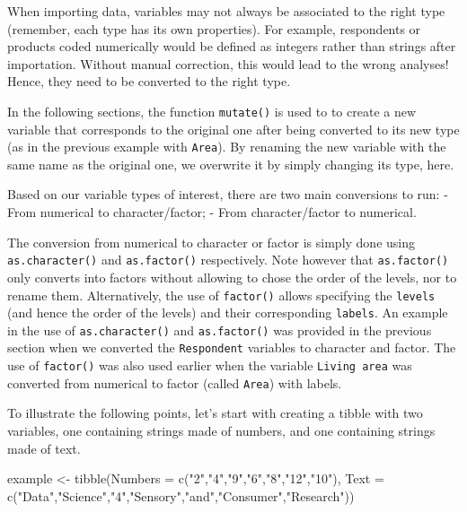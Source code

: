\documentclass[
]{book}
\newenvironment{Shaded}{\begin{snugshade}}{\end{snugshade}}
\newcommand{\AttributeTok}[1]{\textcolor[rgb]{0.77,0.63,0.00}{#1}}
\newcommand{\FunctionTok}[1]{\textcolor[rgb]{0.00,0.00,0.00}{#1}}
\newcommand{\NormalTok}[1]{#1}
\newcommand{\OtherTok}[1]{\textcolor[rgb]{0.56,0.35,0.01}{#1}}
\newcommand{\StringTok}[1]{\textcolor[rgb]{0.31,0.60,0.02}{#1}}
\begin{document}
When importing data, variables may not always be associated to the right type (remember, each type has its own properties). For example, respondents or products coded numerically would be defined as integers rather than strings after importation. Without manual correction, this would lead to the wrong analyses! Hence, they need to be converted to the right type.

In the following sections, the function \texttt{mutate()} is used to to create a new variable that corresponds to the original one after being converted to its new type (as in the previous example with \texttt{Area}). By renaming the new variable with the same name as the original one, we overwrite it by simply changing its type, here.

Based on our variable types of interest, there are two main conversions to run:
- From numerical to character/factor;
- From character/factor to numerical.

The conversion from numerical to character or factor is simply done using \texttt{as.character()} and \texttt{as.factor()} respectively. Note however that \texttt{as.factor()} only converts into factors without allowing to chose the order of the levels, nor to rename them. Alternatively, the use of \texttt{factor()} allows specifying the \texttt{levels} (and hence the order of the levels) and their corresponding \texttt{labels}. An example in the use of \texttt{as.character()} and \texttt{as.factor()} was provided in the previous section when we converted the \texttt{Respondent} variables to character and factor. The use of \texttt{factor()} was also used earlier when the variable \texttt{Living\ area} was converted from numerical to factor (called \texttt{Area}) with labels.

To illustrate the following points, let's start with creating a tibble with two variables, one containing strings made of numbers, and one containing strings made of text.

\begin{Shaded}
\begin{Highlighting}[]
\NormalTok{example }\OtherTok{\textless{}{-}} \FunctionTok{tibble}\NormalTok{(}\AttributeTok{Numbers =} \FunctionTok{c}\NormalTok{(}\StringTok{"2"}\NormalTok{,}\StringTok{"4"}\NormalTok{,}\StringTok{"9"}\NormalTok{,}\StringTok{"6"}\NormalTok{,}\StringTok{"8"}\NormalTok{,}\StringTok{"12"}\NormalTok{,}\StringTok{"10"}\NormalTok{),}
                  \AttributeTok{Text =} \FunctionTok{c}\NormalTok{(}\StringTok{"Data"}\NormalTok{,}\StringTok{"Science"}\NormalTok{,}\StringTok{"4"}\NormalTok{,}\StringTok{"Sensory"}\NormalTok{,}\StringTok{"and"}\NormalTok{,}\StringTok{"Consumer"}\NormalTok{,}\StringTok{"Research"}\NormalTok{))}
\end{Highlighting}
\end{Shaded}
\end{document}
